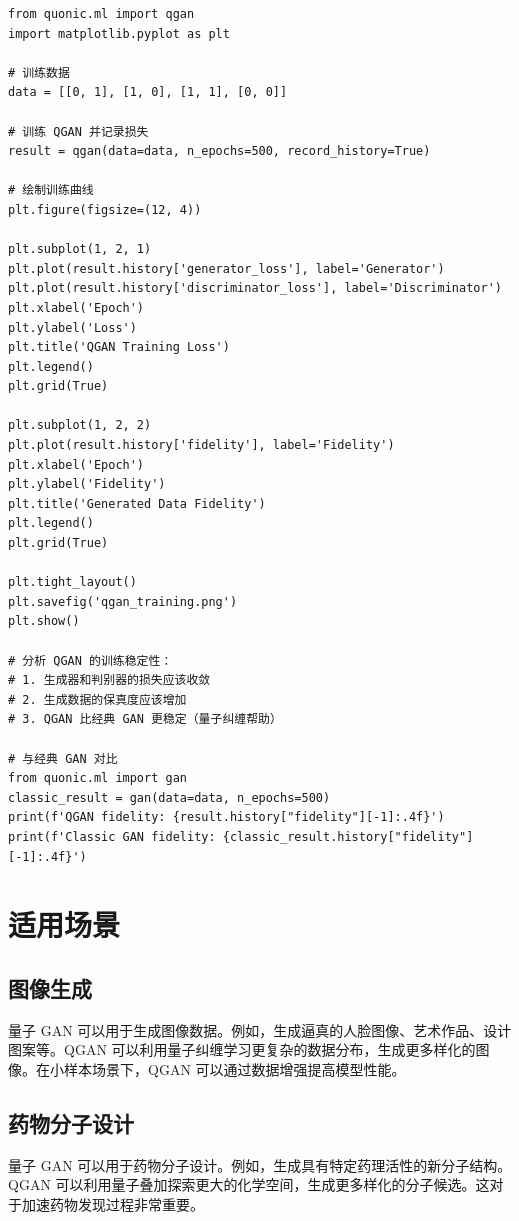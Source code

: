 \documentclass[12pt,a4paper]{article}
\begin{document}
\begin{verbatim}
from quonic.ml import qgan
import matplotlib.pyplot as plt

# 训练数据
data = [[0, 1], [1, 0], [1, 1], [0, 0]]

# 训练 QGAN 并记录损失
result = qgan(data=data, n_epochs=500, record_history=True)

# 绘制训练曲线
plt.figure(figsize=(12, 4))

plt.subplot(1, 2, 1)
plt.plot(result.history['generator_loss'], label='Generator')
plt.plot(result.history['discriminator_loss'], label='Discriminator')
plt.xlabel('Epoch')
plt.ylabel('Loss')
plt.title('QGAN Training Loss')
plt.legend()
plt.grid(True)

plt.subplot(1, 2, 2)
plt.plot(result.history['fidelity'], label='Fidelity')
plt.xlabel('Epoch')
plt.ylabel('Fidelity')
plt.title('Generated Data Fidelity')
plt.legend()
plt.grid(True)

plt.tight_layout()
plt.savefig('qgan_training.png')
plt.show()

# 分析 QGAN 的训练稳定性：
# 1. 生成器和判别器的损失应该收敛
# 2. 生成数据的保真度应该增加
# 3. QGAN 比经典 GAN 更稳定（量子纠缠帮助）

# 与经典 GAN 对比
from quonic.ml import gan
classic_result = gan(data=data, n_epochs=500)
print(f'QGAN fidelity: {result.history["fidelity"][-1]:.4f}')
print(f'Classic GAN fidelity: {classic_result.history["fidelity"][-1]:.4f}')
\end{verbatim}

\section{适用场景}

\subsection{图像生成}

量子 GAN 可以用于生成图像数据。例如，生成逼真的人脸图像、艺术作品、设计图案等。QGAN 可以利用量子纠缠学习更复杂的数据分布，生成更多样化的图像。在小样本场景下，QGAN 可以通过数据增强提高模型性能。

\subsection{药物分子设计}

量子 GAN 可以用于药物分子设计。例如，生成具有特定药理活性的新分子结构。QGAN 可以利用量子叠加探索更大的化学空间，生成更多样化的分子候选。这对于加速药物发现过程非常重要。
\end{document}
